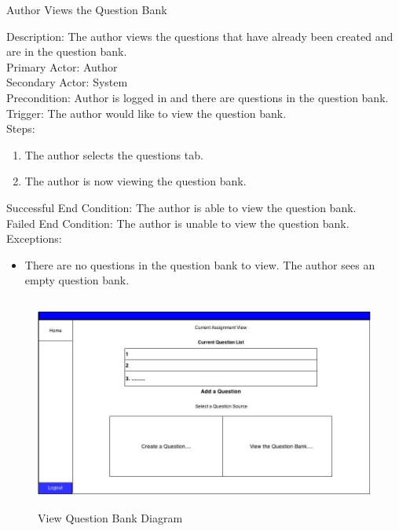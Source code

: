    \begin{section}{Author Views the Question Bank}
    
Description: The author views the questions that have already been created and are in the question bank.\\
Primary Actor: Author\\
Secondary Actor: System \\
Precondition: Author is logged in and there are questions in the question bank.\\
Trigger: The author would like to view the question bank.\\
Steps:
\begin{enumerate}
\item The author selects the questions tab.
\item The author is now viewing the question bank.

\end{enumerate}

Successful End Condition: The author is able to view the question bank.\\
Failed End Condition: The author is unable to view the question bank.\\
Exceptions:
\begin{itemize}
\item There are no questions in the question bank to view. The author sees an empty question bank.
\end{itemize}
    \begin{figure}[H]
            \centerline{\includegraphics[height=7cm]{AssignmentView.jpg}}
            \caption{View Question Bank Diagram}
    \end{figure}
    \end{section}
    
    
    
